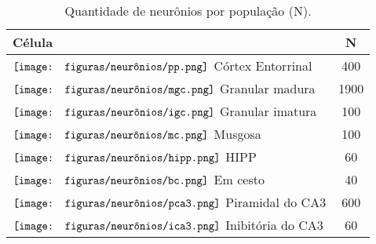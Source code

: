 \begin{table}[h!]
\centering
\renewcommand{\arraystretch}{1.4}
\begin{tabular}{lc}
\toprule
\textbf{Célula} & \textbf{N} \\
\midrule
$\vcenter{\hbox{\texttt{[image: figuras/neurônios/pp.png]}}}$ Córtex Entorrinal & 400 \\
$\vcenter{\hbox{\texttt{[image: figuras/neurônios/mgc.png]}}}$ Granular madura & 1900 \\
$\vcenter{\hbox{\texttt{[image: figuras/neurônios/igc.png]}}}$ Granular imatura & 100 \\
$\vcenter{\hbox{\texttt{[image: figuras/neurônios/mc.png]}}}$ Musgosa & 100 \\
$\vcenter{\hbox{\texttt{[image: figuras/neurônios/hipp.png]}}}$ HIPP & 60 \\
$\vcenter{\hbox{\texttt{[image: figuras/neurônios/bc.png]}}}$ Em cesto & 40 \\
$\vcenter{\hbox{\texttt{[image: figuras/neurônios/pca3.png]}}}$ Piramidal do CA3 & 600 \\
$\vcenter{\hbox{\texttt{[image: figuras/neurônios/ica3.png]}}}$ Inibitória do CA3 & 60 \\
\bottomrule
\end{tabular}
\caption{Quantidade de neurônios por população (N).}\label{tab:neuron_counts}
\end{table}
